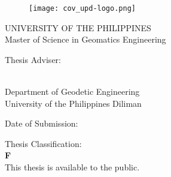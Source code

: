 

\setcounter{page}{1}

\newpage
\thispagestyle{empty}
\begin{center}

	\begin{figure}
	\centering
	\texttt{[image: cov\_upd-logo.png]}
	\label{fig: cover-uplogo}
	\end{figure}

  	{UNIVERSITY OF THE PHILIPPINES\\[0.5cm]
	 Master of Science in Geomatics Engineering}
  	 \vspace*{1cm}
  
  	{\textbf \authorname}
  	 \vspace*{0.2cm}
  
  	\begin{singlespace}
  		{\thesistitle}
  	\end{singlespace}  
  
  	\vspace*{0.5cm}

	{Thesis Adviser:}\\[0.5cm]
	 \begin{singlespace}
  	 	\textbf \advisername\\
  	 	{Department of Geodetic Engineering\\
  	 	University of the Philippines Diliman}
  	 \end{singlespace}
  	 \vspace*{1cm}

  	{Date of Submission:\\ 
  	 \thesismonthyear}
  	 \vspace*{1cm}
  	
  	{Thesis Classification:\\ 
  	 \textbf{F}\\
  	 This thesis is available to the public.}
  	 \vspace*{1cm}  

\end{center}


\newpage
\thispagestyle{empty}

